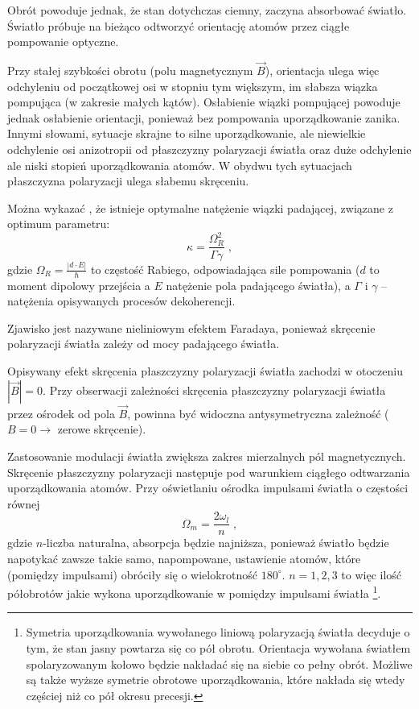 \documentclass[a4paper,10pt]{article}
\begin{document}
Obrót powoduje jednak, że stan dotychczas ciemny, zaczyna absorbować światło. Światło próbuje na bieżąco odtworzyć orientację atomów przez ciągłe pompowanie optyczne.

Przy stałej szybkości obrotu (polu magnetycznym $\vec B$), orientacja ulega więc odchyleniu od początkowej osi w stopniu tym większym, im słabsza wiązka pompująca (w zakresie małych kątów). Osłabienie wiązki pompującej powoduje jednak osłabienie orientacji, ponieważ bez pompowania uporządkowanie zanika. Innymi słowami, sytuacje skrajne to silne uporządkowanie, ale niewielkie odchylenie osi anizotropii od płaszczyzny polaryzacji światła oraz duże odchylenie ale niski stopień uporządkowania atomów. W obydwu tych sytuacjach płaszczyzna polaryzacji ulega słabemu skręceniu.

Można wykazać \cite{srivansan}, że istnieje optymalne natężenie wiązki padającej, związane z optimum parametru:
\begin{equation}
\kappa=\frac{\Omega_R^2}{\Gamma\gamma} \; ,
\end{equation}
gdzie $\Omega_R=\frac{|d \cdot E|}{\hbar}$ to częstość Rabiego, odpowiadająca sile pompowania ($d$ to moment dipolowy przejścia a $E$ natężenie pola padającego światła), a $\Gamma$ i $\gamma$ -- natężenia opisywanych procesów dekoherencji.

Zjawisko jest nazywane nieliniowym efektem Faradaya, ponieważ skręcenie polaryzacji światła zależy od mocy padającego światła.

Opisywany efekt skręcenia płaszczyzny polaryzacji światła zachodzi w otoczeniu $|\vec B|=0$. Przy obserwacji zależności skręcenia płaszczyzny polaryzacji światła przez ośrodek od pola $\vec B$, powinna być widoczna antysymetryczna zależność ($B=0\rightarrow$ zerowe skręcenie).

 Zastosowanie modulacji światła zwiększa zakres mierzalnych pól magnetycznych. Skręcenie płaszczyzny polaryzacji następuje pod warunkiem ciągłego odtwarzania uporządkowania atomów. Przy oświetlaniu ośrodka impulsami światła o częstości równej
\begin{equation}
\Omega_m=\frac{2 \omega_l}{n} \; ,
\end{equation}
gdzie $n$-liczba naturalna, absorpcja będzie najniższa, ponieważ światło będzie napotykać zawsze takie samo, napompowane, ustawienie atomów, które (pomiędzy impulsami) obróciły się o wielokrotność $180^{\circ}$.  $n=1,2,3$ to więc ilość półobrotów jakie wykona uporządkowanie w pomiędzy impulsami światła \footnote{Symetria uporządkowania wywołanego liniową polaryzacją światła decyduje o tym, że stan jasny powtarza się co pół obrotu. Orientacja wywołana światłem spolaryzowanym kołowo będzie nakładać się na siebie co pełny obrót. Możliwe są także wyższe symetrie obrotowe uporządkowania, które nakłada się wtedy częściej niż co pół okresu precesji.}.
\end{document}
